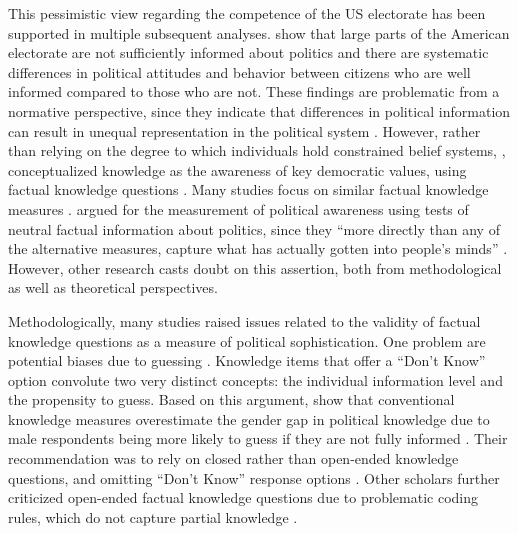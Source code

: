 \documentclass[12pt]{article}
\begin{document}
This pessimistic view regarding the competence of the US electorate has been supported in multiple subsequent analyses. \citet{carpini1996americans} show that large parts of the American electorate are not sufficiently informed about politics and there are systematic differences in political attitudes and behavior between citizens who are well informed compared to those who are not. These findings are problematic from a normative perspective, since they indicate that differences in political information can result in unequal representation in the political system \citep[see also][]{althaus1998information,kuklinski2000misinformation,gilens2001political}. However, rather than relying on the degree to which individuals hold constrained belief systems, \citet{carpini1996americans}, conceptualized knowledge as the awareness of key democratic values, using factual knowledge questions \citep[see also][]{carpini1993measuring}. Many studies focus on similar factual knowledge measures \citep[e.g.][]{zaller1991information,jacoby1995structure,gomez2001political}.  \citet{zaller1992nature} argued for the measurement of political awareness using tests of neutral factual information about politics, since they ``more directly than any of the alternative measures, capture what has actually gotten into people’s minds'' \citep[21]{zaller1992nature}. However, other research casts doubt on this assertion, both from methodological as well as theoretical perspectives.

Methodologically, many studies raised issues related to the validity of factual knowledge questions as a measure of political sophistication. One problem  are potential biases due to guessing \citep{mondak2000reconsidering,mondak2001developing,mondak2001asked,miller2008experimenting}. Knowledge items that offer a ``Don't Know'' option convolute two very distinct concepts: the individual information level and the propensity to guess. Based on this argument, \citet{mondak2004knowledge} show that conventional knowledge measures overestimate the gender gap in political knowledge due to male respondents being more likely to guess if they are not fully informed \citep[see also][]{pietryka2013analysis}. Their recommendation was to rely on closed rather than open-ended knowledge questions, and omitting ``Don't Know'' response options \citep[but see][]{sturgis2008experiment,luskin2011don}. Other scholars further criticized open-ended factual knowledge questions due to problematic coding rules, which do not capture partial knowledge \citep{krosnick2008problems,gibson2009knowing,debell2013harder}.
\end{document}
